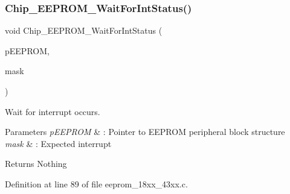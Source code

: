 \mbox{\label{group___e_e_p_r_o_m__18_x_x__43_x_x_ga9bf344a5bd3a2035573b2d080f11c484}} 
\subsubsection{\texorpdfstring{Chip\+\_\+\+E\+E\+P\+R\+O\+M\+\_\+\+Wait\+For\+Int\+Status()}{Chip\_EEPROM\_WaitForIntStatus()}}
{\footnotesize\ttfamily void Chip\+\_\+\+E\+E\+P\+R\+O\+M\+\_\+\+Wait\+For\+Int\+Status (\begin{DoxyParamCaption}\item[{\hyperlink{struct_l_p_c___e_e_p_r_o_m___t}{L\+P\+C\+\_\+\+E\+E\+P\+R\+O\+M\+\_\+T} $\ast$}]{p\+E\+E\+P\+R\+OM,  }\item[{uint32\+\_\+t}]{mask }\end{DoxyParamCaption})}



Wait for interrupt occurs. 


\begin{DoxyParams}{Parameters}
{\em p\+E\+E\+P\+R\+OM} & \+: Pointer to E\+E\+P\+R\+OM peripheral block structure \\
\hline
{\em mask} & \+: Expected interrupt \\
\hline
\end{DoxyParams}
\begin{DoxyReturn}{Returns}
Nothing 
\end{DoxyReturn}


Definition at line 89 of file eeprom\+\_\+18xx\+\_\+43xx.\+c.


